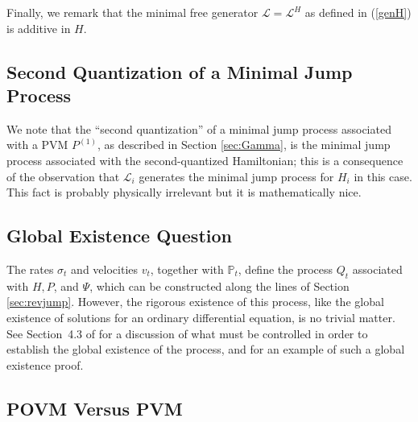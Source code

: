\documentclass[12pt]{article}
\newcommand{\1}{\mathbf{1}} %
\newcommand{\measure}{\mathbb{P}} %
\newcommand{\generator}{\mathscr{L}} %
\newcommand{\pov}{{P}}%
\begin{document}
Finally, we remark that the minimal free generator $\generator =
\generator^H$ as defined in (\ref{genH}) is additive in $H$.



\label{sec:mini3}


\subsection{Second Quantization of a Minimal Jump Process}

   We note that the ``second quantization'' of a minimal jump
   process associated with a PVM $\pov^{(1)}$, as described in Section
   \ref{sec:Gamma}, is the minimal jump process associated with the
   second-quantized Hamiltonian; this is a consequence of the
   observation that $\generator_i$ generates the minimal jump process
   for $H_i$ in this case. This fact is probably physically irrelevant
   but it is mathematically nice.



\subsection{Global Existence Question}

The rates $\sigma_t$ and velocities $v_t$, together with $\measure_t$,
define the process $Q_t$ associated with $H,\pov$, and $\Psi$, which
can be constructed along the lines of Section
\ref{sec:revjump}. However, the rigorous existence of this process,
like the global existence of solutions for an ordinary differential
equation, is no trivial matter.  See Section~4.3 of \cite{crea2A} for
a discussion of what must be controlled in order to establish the
global existence of the process, and \cite{crex1} for an example of
such a global existence proof.



\subsection{POVM Versus PVM}
\end{document}
